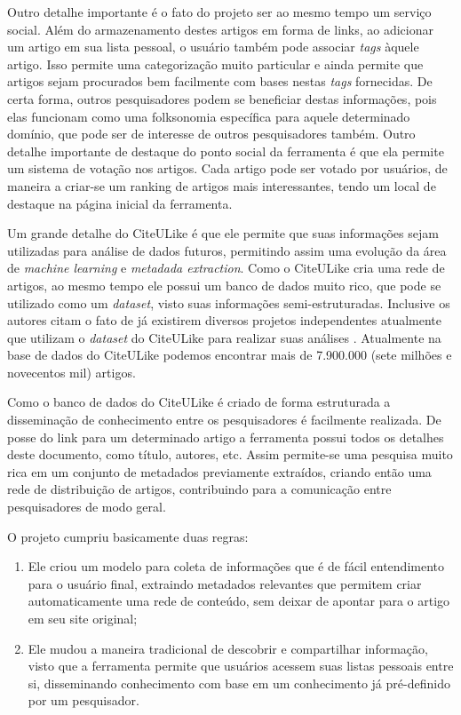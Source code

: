 \begin{textnew}
Outro detalhe importante é o fato do projeto ser ao mesmo tempo um serviço social. Além do armazenamento destes artigos em forma de links, ao adicionar um artigo em sua lista pessoal, o usuário também pode associar \emph{tags} àquele artigo. Isso permite uma categorização muito particular e ainda permite que artigos sejam procurados bem facilmente com bases nestas \emph{tags} fornecidas. De certa forma, outros pesquisadores podem se beneficiar destas informações, pois elas funcionam como uma folksonomia específica para aquele determinado domínio, que pode ser de interesse de outros pesquisadores também. Outro detalhe importante de destaque do ponto social da ferramenta é que ela permite um sistema de votação nos artigos. Cada artigo pode ser votado por usuários, de maneira a criar-se um ranking de artigos mais interessantes, tendo um local de destaque na página inicial da ferramenta.

Um grande detalhe do CiteULike é que ele permite que suas informações sejam utilizadas para análise de dados futuros, permitindo assim uma evolução da área de \emph{machine learning} e \emph{metadada extraction}. Como o CiteULike cria uma rede de artigos, ao mesmo tempo ele possui um banco de dados muito rico, que pode se utilizado como um \emph{dataset}, visto suas informações semi-estruturadas. Inclusive os autores citam o fato de já existirem diversos projetos independentes atualmente que utilizam o \emph{dataset} do CiteULike para realizar suas análises \cite{citeulike}. Atualmente na base de dados do CiteULike podemos encontrar mais de 7.900.000 (sete milhões e novecentos mil) artigos.

Como o banco de dados do CiteULike é criado de forma estruturada a disseminação de conhecimento entre os pesquisadores é facilmente realizada. De posse do link para um determinado artigo a ferramenta possui todos os detalhes deste documento, como título, autores, etc. Assim permite-se uma pesquisa muito rica em um conjunto de metadados previamente extraídos, criando então uma rede de distribuição de artigos, contribuindo para a comunicação entre pesquisadores de modo geral.

O projeto cumpriu basicamente duas regras:

\begin{enumerate}
    \item Ele criou um modelo para coleta de informações que é de fácil entendimento para o usuário final, extraindo metadados relevantes que permitem criar automaticamente uma rede de conteúdo, sem deixar de apontar para o artigo em seu site original;
    \item Ele mudou a maneira tradicional de descobrir e compartilhar informação, visto que a ferramenta permite que usuários acessem suas listas pessoais entre si, disseminando conhecimento com base em um conhecimento já pré-definido por um pesquisador.
\end{enumerate}


\end{textnew}
